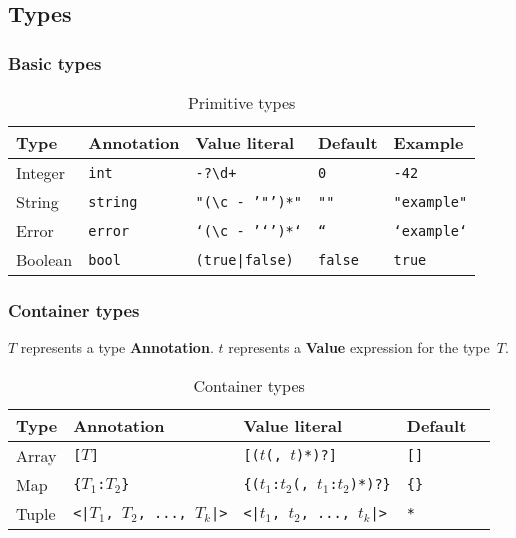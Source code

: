 \documentclass{article}
\begin{document}
\subsection{Types}

\subsubsection{Basic types}

\begin{table}[h]
\centering
\label{primitive-types}
\begin{tabular}{|l|l|l|l|l|} \hline
\textbf{Type} & \textbf{Annotation} & \textbf{Value literal}               & \textbf{Default} & \textbf{Example}   \\ \hline
Integer       & \texttt{int}        & \texttt{-?\textbackslash d+}         & \texttt{0}       & \texttt{-42}       \\ \hline
String        & \texttt{string}     & \texttt{"(\textbackslash c - '"')*"} & \texttt{""}      & \texttt{"example"} \\ \hline
Error         & \texttt{error}      & \texttt{`(\textbackslash c - '`')*`} & \texttt{``}      & \texttt{`example`} \\ \hline
Boolean       & \texttt{bool}       & \texttt{(true|false)}                & \texttt{false}   & \texttt{true}      \\ \hline
\end{tabular}
\caption{Primitive types}
\end{table}

\subsubsection{Container types}
$T$ represents a type \textbf{Annotation}. $t$ represents a \textbf{Value}
expression for the type~$T$.

\begin{table}[h]
\centering
\label{container-types}
\begin{tabular}{|l|l|l|l|l|} \hline
\textbf{Type} & \textbf{Annotation}                   & \textbf{Value literal}                      & \textbf{Default} \\ \hline
Array         & \texttt{[$T$]}                        & \texttt{[($t$(, $t$)*)?]}                   & \texttt{[]}      \\ \hline
Map           & \texttt{\{$T_1$:$T_2$\}}              & \texttt{\{($t_1$:$t_2$(, $t_1$:$t_2$)*)?\}} & \texttt{\{\}}    \\ \hline
Tuple         & \texttt{<|$T_1$, $T_2$, ..., $T_k$|>} & \texttt{<|$t_1$, $t_2$, ..., $t_k$|>}       & \texttt{*}       \\ \hline
\end{tabular}
\caption{Container types}
\end{table}
\end{document}
